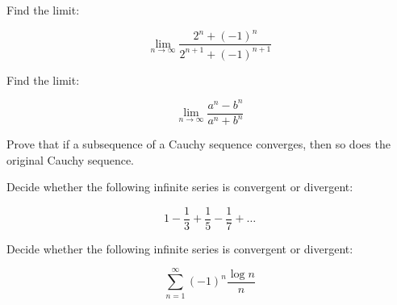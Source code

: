 \documentclass[12pt,letterpaper]{hmcpset}
\begin{document}
\begin{solution}

\end{solution}

\begin{problem}[22.2.iii]

Find the limit:

\[ \lim_{n \to \infty} \dfrac{2^n+(-1)^n}{2^{n+1}+(-1)^{n+1}} \]

\end{problem}

\begin{solution}
	
\end{solution}

\begin{problem}[22.2.v]

Find the limit:

\[ \lim_{n \to \infty} \dfrac{a^n-b^n}{a^n+b^n}\]

\end{problem}

\begin{solution}
\end{solution}

\begin{problem}[22.4.a]

Prove that if a subsequence of a Cauchy sequence converges, then so does the original Cauchy sequence.

\end{problem}
\begin{solution}
\end{solution}

\begin{problem}[23.1.ii]

Decide whether the following infinite series is convergent or divergent:

\[ 1 - \dfrac{1}{3} + \dfrac{1}{5} - \dfrac{1}{7} + \ldots \]

\end{problem}

\begin{solution}

\end{solution}

\begin{problem}[23.1.iv]

Decide whether the following infinite series is convergent or divergent:

\[ \sum_{n=1}^{\infty} (-1)^n \dfrac{\log{n}}{n}\]

\end{problem}
\end{document}
